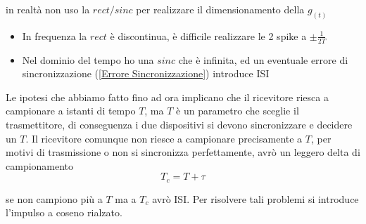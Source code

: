             in realtà non uso la $rect/sinc$ per realizzare il dimensionamento della $g_{(t)}$ 
            \begin{itemize}
                \item {In frequenza la $rect$ è discontinua, è difficile realizzare le 2 spike a $\pm\frac{1}{2T}$}
                \item {Nel dominio del tempo ho una $sinc$ che è infinita, ed un eventuale errore di sincronizzazione
                (\ref{Errore Sincronizzazione}) introduce ISI}
            \end{itemize}
            Le ipotesi che abbiamo fatto fino ad ora implicano che il ricevitore riesca a campionare a istanti
            di tempo $T$, ma $T$ è un parametro che sceglie il trasmettitore, di conseguenza\label{Errore Sincronizzazione}
            i due dispositivi si devono sincronizzare e decidere un $T$. Il ricevitore comunque non riesce a campionare
            precisamente a $T$, per motivi di trasmissione o non si sincronizza perfettamente, avrò un leggero delta di campionamento
            \[
                T_c = T+ \tau  
            \]
            \begin{figure}[H]
                \centering
            \end{figure}
            se non campiono più a $T$ ma a $T_c$ avrò ISI. Per risolvere tali problemi si introduce l'impulso a coseno rialzato.
            
